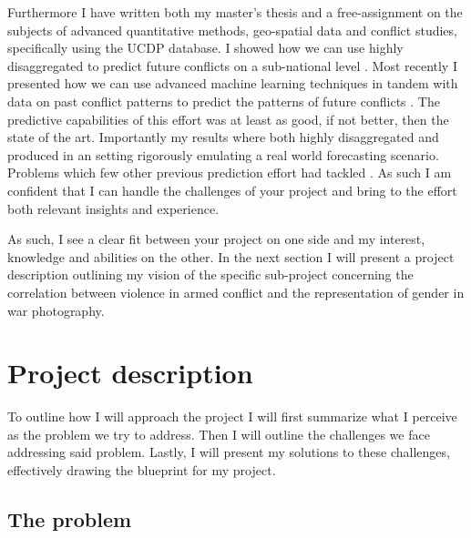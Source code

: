 \documentclass[a4paper]{article}
\begin{document}
Furthermore I have written both my master's thesis \citep{SPECIALE} and a free-assignment \citep{Maase} on the subjects of advanced quantitative methods, geo-spatial data and conflict studies, specifically using the UCDP database. I showed how we can use highly disaggregated to predict future conflicts on a sub-national level \cite{Maase,SPECIALE}. Most recently I presented how we can use advanced machine learning techniques in tandem with data on past conflict patterns to predict the patterns of future conflicts \cite{SPECIALE}. The predictive capabilities of this effort was at least as good, if not better, then the state of the art. Importantly my results where both highly disaggregated and produced in an setting rigorously emulating a real world forecasting scenario. Problems which few other previous prediction effort had tackled \citep[48-50]{SPECIALE}. As such I am confident that I can handle the challenges of your project and bring to the effort both relevant insights and experience.\par

As such, I see a clear fit between your project on one side and my interest, knowledge and abilities on the other. In the next section I will present a project description outlining my vision of the specific sub-project concerning the correlation between violence in armed conflict and the representation of gender in war photography.\par

\section{Project description} 

To outline how I will approach the project I will first summarize what I perceive as the problem we try to address. Then I will outline the challenges we face addressing said problem. Lastly, I will present my solutions to these challenges, effectively drawing the blueprint for my project.\par

\subsection{The problem}

\end{document}
